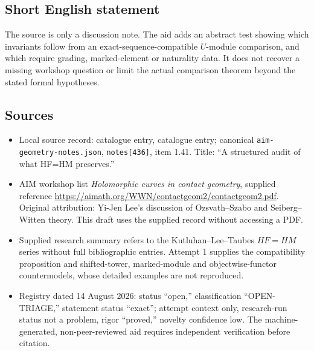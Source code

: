 \documentclass[11pt]{article}
\begin{document}
\subsection{Short English statement}
The source is only a discussion note. The aid adds an abstract test showing which invariants follow from an exact-sequence-compatible \(U\)-module comparison, and which require grading, marked-element or naturality data. It does not recover a missing workshop question or limit the actual comparison theorem beyond the stated formal hypotheses.
\subsection{Sources}
\begin{itemize}
\item Local source record: catalogue entry, catalogue entry; canonical \texttt{aim-geometry-notes.json}, \texttt{notes[436]}, item 1.41. Title: ``A structured audit of what HF=HM preserves.''
\item AIM workshop list \emph{Holomorphic curves in contact geometry}, supplied reference \url{https://aimath.org/WWN/contactgeom2/contactgeom2.pdf}. Original attribution: Yi-Jen Lee's discussion of Ozsvath--Szabo and Seiberg--Witten theory. This draft uses the supplied record without accessing a PDF.
\item Supplied research summary refers to the Kutluhan--Lee--Taubes \(HF=HM\) series without full bibliographic entries. Attempt 1 supplies the compatibility proposition and shifted-tower, marked-module and objectwise-functor countermodels, whose detailed examples are not reproduced.
\item Registry dated 14 August 2026: status ``open,'' classification ``OPEN-TRIAGE,'' statement status ``exact''; attempt context only, research-run status not a problem, rigor ``proved,'' novelty confidence low. The machine-generated, non-peer-reviewed aid requires independent verification before citation.
\end{itemize}
\end{document}
